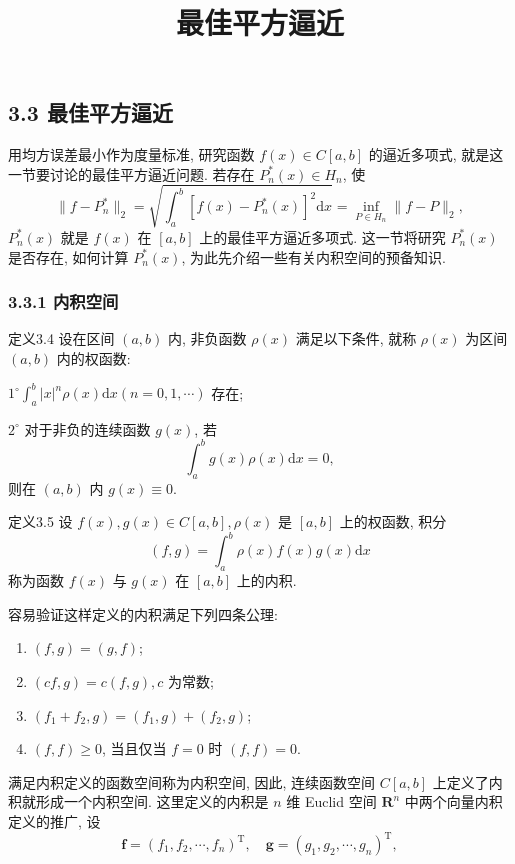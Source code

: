 \documentclass[
  10pt,
  fontset=fandol]{ctexart}
\title{最佳平方逼近}
\author{}
\date{}
\begin{document}
\maketitle

\subsection{3.3 最佳平方逼近}\label{ux6700ux4f73ux5e73ux65b9ux903cux8fd1}

用均方误差最小作为度量标准, 研究函数 \(f(x) \in C[a,b]\) 的逼近多项式, 就是这一节要讨论的最佳平方逼近问题. 若存在 \(P_n^*(x) \in H_n\), 使 \[
\|f - P_n^*\|_2 = \sqrt{\int_a^b [f(x) - P_n^*(x)]^2 \mathrm{d}x} = \inf_{P \in H_n} \|f - P\|_2, \tag{3.3.1}
\] \(P_n^*(x)\) 就是 \(f(x)\) 在 \([a,b]\) 上的最佳平方逼近多项式. 这一节将研究 \(P_n^*(x)\) 是否存在, 如何计算 \(P_n^*(x)\), 为此先介绍一些有关内积空间的预备知识.

\subsubsection{3.3.1 内积空间}\label{ux5185ux79efux7a7aux95f4}

定义3.4 设在区间 \((a,b)\) 内, 非负函数 \(\rho(x)\) 满足以下条件, 就称 \(\rho(x)\) 为区间 \((a,b)\) 内的权函数:

\(1^\circ \int_a^b |x|^n \rho(x) \mathrm{d}x (n = 0,1,\cdots)\) 存在;

\(2^\circ\) 对于非负的连续函数 \(g(x)\), 若 \[
\int_a^b g(x) \rho(x) \mathrm{d}x = 0, \tag{3.3.2}
\] 则在 \((a,b)\) 内 \(g(x) \equiv 0\).

定义3.5 设 \(f(x), g(x) \in C[a,b], \rho(x)\) 是 \([a,b]\) 上的权函数, 积分 \[
(f,g) = \int_a^b \rho(x) f(x) g(x) \mathrm{d}x \tag{3.3.3}
\] 称为函数 \(f(x)\) 与 \(g(x)\) 在 \([a,b]\) 上的内积.

容易验证这样定义的内积满足下列四条公理:

\begin{enumerate}
\def\labelenumi{(\arabic{enumi})}
\item
  \((f,g) = (g,f)\);
\item
  \((cf,g) = c(f,g), c\) 为常数;
\item
  \((f_1 + f_2, g) = (f_1, g) + (f_2, g)\);
\item
  \((f,f) \geqslant 0\), 当且仅当 \(f=0\) 时 \((f,f)=0\).
\end{enumerate}

满足内积定义的函数空间称为内积空间, 因此, 连续函数空间 \(C[a,b]\) 上定义了内积就形成一个内积空间. 这里定义的内积是 \(n\) 维 Euclid 空间 \(\mathbf{R}^n\) 中两个向量内积定义的推广, 设 \[
\boldsymbol{f} = (f_1, f_2, \cdots, f_n)^{\mathrm{T}}, \quad \boldsymbol{g} = (g_1, g_2, \cdots, g_n)^{\mathrm{T}},
\]
\end{document}

